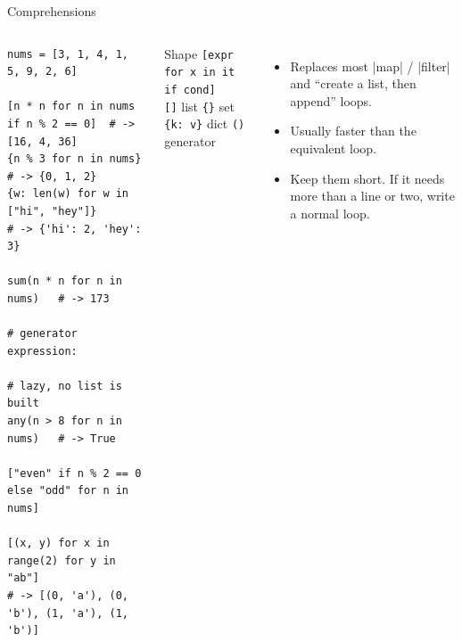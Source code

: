\documentclass[aspectratio=169,9pt]{beamer}
\newcommand{\cc}[1]{\texttt{#1}}                      %
\newcommand{\hint}[1]{{\small\color{ink2}#1}}  %
\begin{document}
\begin{frame}[fragile]{Comprehensions}
\begin{columns}[T]
\begin{lstlisting}
nums = [3, 1, 4, 1, 5, 9, 2, 6]

[n * n for n in nums if n % 2 == 0]  # -> [16, 4, 36]
{n % 3 for n in nums}                # -> {0, 1, 2}
{w: len(w) for w in ["hi", "hey"]}
# -> {'hi': 2, 'hey': 3}

sum(n * n for n in nums)   # -> 173
                           # generator expression:
                           # lazy, no list is built
any(n > 8 for n in nums)   # -> True

["even" if n % 2 == 0 else "odd" for n in nums]

[(x, y) for x in range(2) for y in "ab"]
# -> [(0, 'a'), (0, 'b'), (1, 'a'), (1, 'b')]
\end{lstlisting}
\begin{block}{Shape}
\centering
\cc{[\alert{expr} for x in it if \alert{cond}]}\\[3pt]
\hint{\cc{[]} list \textperiodcentered{} \cc{\{\}} set
\textperiodcentered{} \cc{\{k: v\}} dict \textperiodcentered{}
\cc{()} generator}
\end{block}
\begin{itemize}\setlength\itemsep{5pt}
  \item Replaces most |map| / |filter| and
        ``create a list, then append'' loops.
  \item Usually faster than the equivalent loop.
  \item Keep them short. If it needs more than a line or two,
        write a normal loop.
\end{itemize}
\end{columns}
\end{frame}
\end{document}
